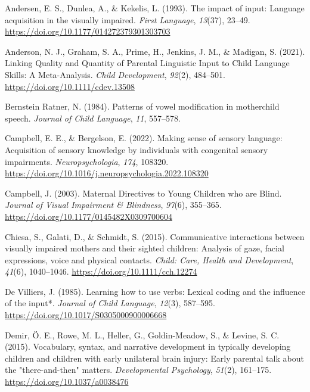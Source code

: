 \documentclass[
  man]{apa6}
\newlength{\cslhangindent}
\newlength{\cslentryspacingunit} %
\newenvironment{CSLReferences}[2] %
 {%
  \setlength{\parindent}{0pt}
  \ifodd #1
  \let\oldpar\par
  \def\par{\hangindent=\cslhangindent\oldpar}
  \fi
  \setlength{\parskip}{#2\cslentryspacingunit}
 }%
 {}
\begin{document}
\hypertarget{refs}{}
\begin{CSLReferences}{1}{0}
\leavevmode{}%
Andersen, E. S., Dunlea, A., \& Kekelis, L. (1993). The impact of input: Language acquisition in the visually impaired. \emph{First Language}, \emph{13}(37), 23--49. \url{https://doi.org/10.1177/014272379301303703}

\leavevmode{}%
Anderson, N. J., Graham, S. A., Prime, H., Jenkins, J. M., \& Madigan, S. (2021). Linking {Quality} and {Quantity} of {Parental Linguistic Input} to {Child Language Skills}: {A Meta-Analysis}. \emph{Child Development}, \emph{92}(2), 484--501. \url{https://doi.org/10.1111/cdev.13508}

\leavevmode{}%
Bernstein Ratner, N. (1984). Patterns of vowel modification in mother\textendash child speech. \emph{Journal of Child Language}, \emph{11}, 557--578.

\leavevmode{}%
Campbell, E. E., \& Bergelson, E. (2022). Making sense of sensory language: {Acquisition} of sensory knowledge by individuals with congenital sensory impairments. \emph{Neuropsychologia}, \emph{174}, 108320. \url{https://doi.org/10.1016/j.neuropsychologia.2022.108320}

\leavevmode{}%
Campbell, J. (2003). Maternal {Directives} to {Young Children} who are {Blind}. \emph{Journal of Visual Impairment \& Blindness}, \emph{97}(6), 355--365. \url{https://doi.org/10.1177/0145482X0309700604}

\leavevmode{}%
Chiesa, S., Galati, D., \& Schmidt, S. (2015). Communicative interactions between visually impaired mothers and their sighted children: Analysis of gaze, facial expressions, voice and physical contacts. \emph{Child: Care, Health and Development}, \emph{41}(6), 1040--1046. \url{https://doi.org/10.1111/cch.12274}

\leavevmode{}%
De Villiers, J. (1985). Learning how to use verbs: Lexical coding and the influence of the input*. \emph{Journal of Child Language}, \emph{12}(3), 587--595. \url{https://doi.org/10.1017/S0305000900006668}

\leavevmode{}%
Demir, Ö. E., Rowe, M. L., Heller, G., Goldin-Meadow, S., \& Levine, S. C. (2015). Vocabulary, syntax, and narrative development in typically developing children and children with early unilateral brain injury: Early parental talk about the "there-and-then" matters. \emph{Developmental Psychology}, \emph{51}(2), 161--175. \url{https://doi.org/10.1037/a0038476}


\end{CSLReferences}
\end{document}
